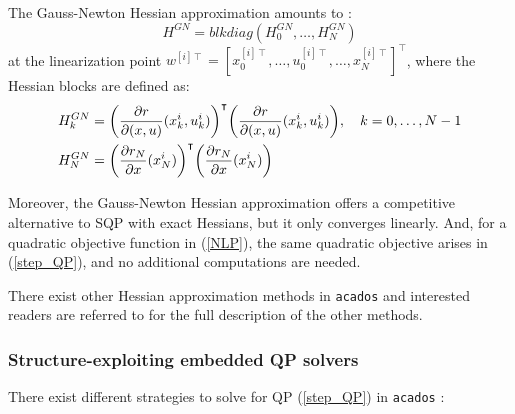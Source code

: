 \documentclass{thesisreport}
\begin{document}
The Gauss-Newton Hessian approximation amounts to \cite{acados2019}:
	\begin{equation}
		H^{GN} = blkdiag(H_0^{GN}, \ldots, H_N^{GN})
	\end{equation}	    
    at the linearization point $w^{[i]\intercal} = [x_0^{[i]\intercal}, \ldots, u_0^{[i] \intercal}, \ldots, x_N^{[i] \intercal}]^{\intercal}$, where the Hessian blocks are defined as:
    \begin{align}
    	H_k^{GN} &= \bigg( \frac{\partial r}{\partial (x,u)} (x_k^i, u_k^i) \bigg)^{\intercal} \bigg( \frac{\partial r}{\partial (x,u)} (x_k^i, u_k^i) \bigg), \text{\space \space \space} k=0,\ldots,N-1 \\
    	H_N^{GN} &= \bigg( \frac{\partial r_N}{\partial x} (x_N^i) \bigg)^{\intercal} \bigg( \frac{\partial r_N}{\partial x} (x_N^i) \bigg)
    \end{align}
    
Moreover, the Gauss-Newton Hessian approximation offers a competitive alternative to SQP with exact Hessians, but it only converges linearly. And, for a quadratic objective function in (\ref{NLP}), the same quadratic objective arises in (\ref{step_QP}), and no additional computations are needed.

There exist other Hessian approximation methods in \texttt{acados} and interested readers are referred to \cite{acados2019} for the full description of the other methods.

\subsubsection{Structure-exploiting embedded QP solvers}

There exist different strategies to solve for QP (\ref{step_QP}) in \texttt{acados} \cite{acados2019}:
\end{document}
